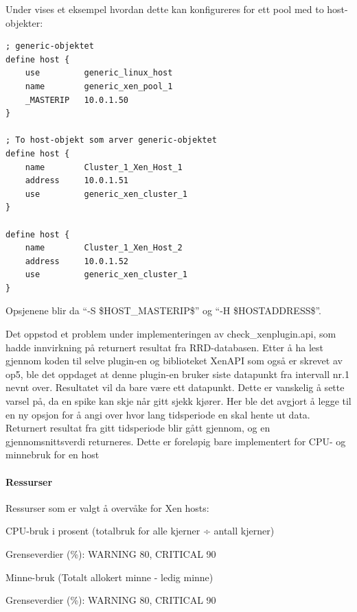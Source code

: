 \clearpage
Under vises et eksempel hvordan dette kan konfigureres for ett pool med to host-objekter:
\begin{lstlisting}[style=example]
; generic-objektet 
define host {
    use         generic_linux_host
    name        generic_xen_pool_1
    _MASTERIP   10.0.1.50
}

; To host-objekt som arver generic-objektet
define host {
    name        Cluster_1_Xen_Host_1
    address     10.0.1.51
    use         generic_xen_cluster_1
}

define host {
    name        Cluster_1_Xen_Host_2
    address     10.0.1.52
    use         generic_xen_cluster_1
}
\end{lstlisting}

Opsjenene blir da ``-S \$HOST\_MASTERIP\$'' og ``-H \$HOSTADDRESS\$''.

Det oppstod et problem under implementeringen av check\_xenplugin.api, som hadde innvirkning på returnert resultat fra RRD-databasen. Etter å ha lest gjennom koden til selve plugin-en og biblioteket XenAPI som også er skrevet av op5, ble det oppdaget at denne plugin-en bruker siste datapunkt fra intervall nr.1 nevnt over. Resultatet vil da bare være ett datapunkt. Dette er vanskelig å sette varsel på, da en spike kan skje når gitt sjekk kjører. Her ble det avgjort å legge til en ny opsjon for å angi over hvor lang tidsperiode en skal hente ut data. Returnert resultat fra gitt tidsperiode blir gått gjennom, og en gjennomsnittsverdi returneres. Dette er foreløpig bare implementert for CPU- og minnebruk for en host


\paragraph{Ressurser}  \mbox\\

Ressurser som er valgt å overvåke for Xen hosts:
\begin{itemize*}
        \item CPU-bruk i prosent (totalbruk for alle kjerner ÷ antall kjerner)
        \begin{itemize*}
		\item Grenseverdier (\%): WARNING 80, CRITICAL 90
        \end{itemize*}
        \item Minne-bruk (Totalt allokert minne - ledig minne)
        \begin{itemize*}
                \item Grenseverdier (\%): WARNING 80, CRITICAL 90
        \end{itemize*}
\end{itemize*}

